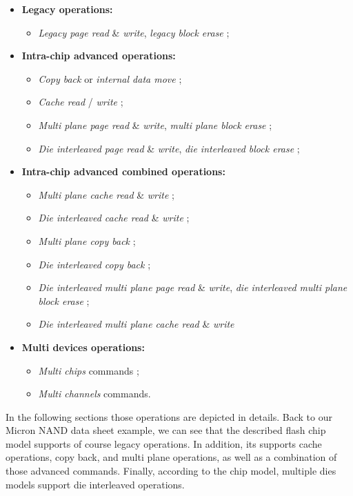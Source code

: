 \begin{itemize}
  \item \textbf{Legacy operations:}
  \begin{itemize}
    \item \emph{Legacy page read} \& \emph{write}, \emph{legacy block erase} ;
  \end{itemize}
  \item \textbf{Intra-chip advanced operations:}
  \begin{itemize}
    \item \emph{Copy back} or \emph{internal data move} ;
    \item \emph{Cache read} / \emph{write} ;
    \item \emph{Multi plane page read} \& \emph{write}, \emph{multi plane block erase} ;
    \item \emph{Die interleaved page read} \& \emph{write}, \emph{die interleaved block erase} ;
  \end{itemize}
  \item \textbf{Intra-chip advanced combined operations:}
  \begin{itemize}
    \item \emph{Multi plane cache read} \& \emph{write} ;
    \item \emph{Die interleaved cache read} \& \emph{write} ;
    \item \emph{Multi plane copy back} ;
    \item \emph{Die interleaved copy back} ;
    \item \emph{Die interleaved multi plane page read} \& \emph{write}, \emph{die interleaved multi plane block erase} ;
    \item \emph{Die interleaved multi plane cache read} \& \emph{write}
  \end{itemize}
  \item \textbf{Multi devices operations:}
  \begin{itemize}
    \item \emph{Multi chips} commands ;
    \item \emph{Multi channels} commands.
  \end{itemize}
\end{itemize}

In the following sections those operations are depicted in details. Back to our Micron NAND data sheet example, we can see that the described flash chip model supports of course legacy operations. In addition, its supports cache operations, copy back, and multi plane operations, as well as a combination of those advanced commands. Finally, according to the chip model, multiple dies models support die interleaved operations.

